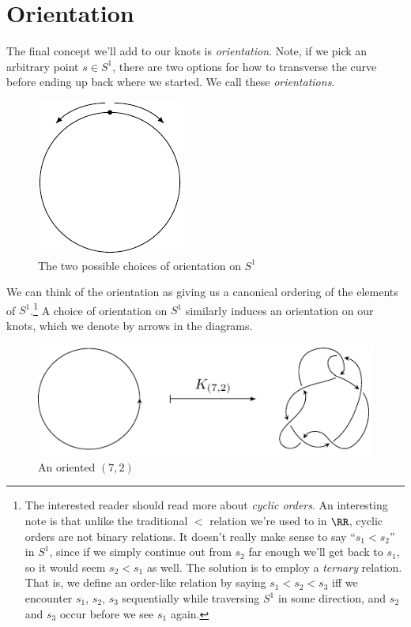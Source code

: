 \section{Orientation}
The final concept we'll add to our knots is \emph{orientation}. Note,
if we pick an arbitrary point $s \in S^1$, there are two options for
how to transverse the curve before ending up back where we started. We
call these \emph{orientations}.
\begin{figure}[H]
  \centering
  \includegraphics{figures/fundamentals/orientation-on-s1.pdf}
  \caption{The two possible choices of orientation on $S^1$}
\end{figure}
We can think of the orientation as giving us a canonical ordering of
the elements of $S^1$.\footnote{The interested reader should read more
  about \emph{cyclic orders}. An interesting note is that unlike the
  traditional $<$ relation we're used to in $\RR$, cyclic orders are
  not binary relations. It doesn't really make sense to say ``$s_1 <
  s_2$'' in $S^1$, since if we simply continue out from $s_2$ far
  enough we'll get back to $s_1$, so it would seem $s_2 < s_1$ as
  well. The solution is to employ a \emph{ternary} relation. That is,
  we define an order-like relation by saying $s_1 < s_2 < s_3$ iff we
  encounter $s_1$, $s_2$, $s_3$ sequentially while traversing $S^1$ in
  some direction, and $s_2$ and $s_3$ occur before we see $s_1$
  again.} A choice of orientation on $S^1$ similarly induces an
orientation on our knots, which we denote by arrows in the diagrams.
\begin{figure}[H]
  \centering
  \includegraphics{figures/fundamentals/oriented-72.pdf}
  \caption{An oriented $(7,2)$}
\end{figure}
